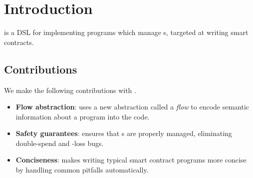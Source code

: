 \documentclass[sigconf]{acmart}
\begin{document}

\maketitle

\section{Introduction}

\langName is a DSL for implementing programs which manage \assetTxt{}s, targeted at writing smart contracts.

\subsection{Contributions}

We make the following contributions with \langName.
\begin{itemize}
    \item \textbf{Flow abstraction}: \langName uses a new abstraction called a \emph{flow} to encode semantic information about a program into the code.

    \item \textbf{Safety guarantees}: \langName ensures that \assetTxt{}s are properly managed, eliminating double-spend and \assetTxt-loss bugs.

    \item \textbf{Conciseness}: \langName makes writing typical smart contract programs more concise by handling common pitfalls automatically.


\end{itemize}
\end{document}
